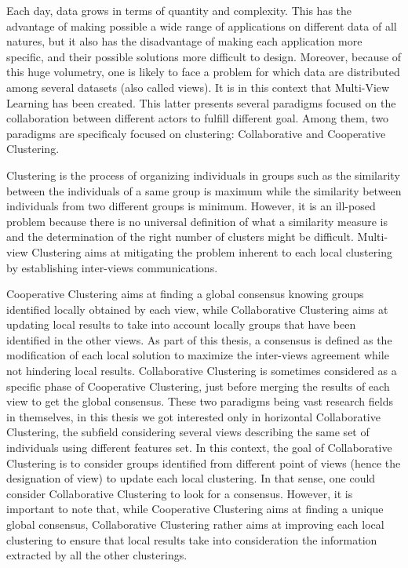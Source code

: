 Each day, data grows in terms of quantity and complexity. This has the advantage of making possible a wide range of applications on different data of all natures, but it also has the disadvantage of making each application more specific, and their possible solutions more difficult to design. Moreover, because of this huge volumetry, one is likely to face a problem for which data are distributed among several datasets (also called views). It is in this context that Multi-View Learning has been created. This latter presents several paradigms focused on the collaboration between different actors to fulfill different goal. Among them, two paradigms are specificaly focused on clustering: Collaborative and Cooperative Clustering.

Clustering is the process of organizing individuals in groups such as the similarity between the individuals of a same group is maximum while the similarity between individuals from two different groups is minimum. However, it is an ill-posed problem because there is no universal definition of what a similarity measure is and the determination of the right number of clusters might be difficult. Multi-view Clustering aims at mitigating the problem inherent to each local clustering by establishing inter-views communications.

Cooperative Clustering aims at finding a global consensus knowing groups identified locally obtained by each view, while Collaborative Clustering aims at updating local results to take into account locally groups that have been identified in the other views. As part of this thesis, a consensus is defined as the modification of each local solution to maximize the inter-views agreement while not hindering local results. Collaborative Clustering is sometimes considered as a specific phase of Cooperative Clustering, just before merging the results of each view to get the global consensus. These two paradigms being vast research fields in themselves, in this thesis we got interested only in horizontal Collaborative Clustering, the subfield considering several views describing the same set of individuals using different features set. In this context, the goal of Collaborative Clustering is to consider groups identified from different point of views (hence the designation of view) to update each local clustering. In that sense, one could consider Collaborative Clustering to look for a consensus. However, it is important to note that, while Cooperative Clustering aims at finding a unique global consensus, Collaborative Clustering rather aims at improving each local clustering to ensure that local results take into consideration the information extracted by all the other clusterings.

